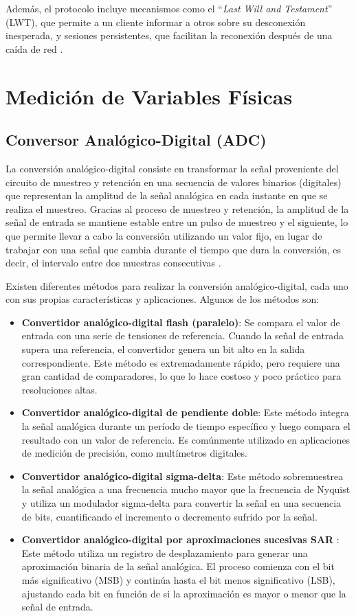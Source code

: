 Además, el protocolo incluye mecanismos como el “\textit{Last Will and Testament}” (LWT), que permite a un cliente informar a otros sobre su desconexión inesperada, y sesiones persistentes, que facilitan la reconexión después de una caída de red \cite{mqtt311, mqtt50}.

\section{Medición de Variables Físicas}
\subsection{Conversor Analógico-Digital (ADC)}
La conversión analógico-digital consiste en transformar la señal proveniente del circuito de muestreo y retención en una secuencia de valores binarios (digitales) que representan la amplitud de la señal analógica en cada instante en que se realiza el muestreo. Gracias al proceso de muestreo y retención, la amplitud de la señal de entrada se mantiene estable entre un pulso de muestreo y el siguiente, lo que permite llevar a cabo la conversión utilizando un valor fijo, en lugar de trabajar con una señal que cambia durante el tiempo que dura la conversión, es decir, el intervalo entre dos muestras consecutivas \cite{floyd2015digital}.

Existen diferentes métodos para realizar la conversión analógico-digital, cada uno con sus propias características y aplicaciones. Algunos de los métodos son:
\begin{itemize}
    \item \textbf{Convertidor analógico-digital flash (paralelo)}: Se compara el valor de entrada con una serie de tensiones de referencia. Cuando la señal de entrada supera una referencia, el convertidor genera un bit alto en la salida correspondiente. Este método es extremadamente rápido, pero requiere una gran cantidad de comparadores, lo que lo hace costoso y poco práctico para resoluciones altas.
    \item \textbf{Convertidor analógico-digital de pendiente doble}: Este método integra la señal analógica durante un período de tiempo específico y luego compara el resultado con un valor de referencia. Es comúnmente utilizado en aplicaciones de medición de precisión, como multímetros digitales.
    \item \textbf{Convertidor analógico-digital sigma-delta}: Este método sobremuestrea la señal analógica a una frecuencia mucho mayor que la frecuencia de Nyquist y utiliza un modulador sigma-delta para convertir la señal en una secuencia de bits, cuantificando el incremento o decremento sufrido por la señal.
    \item \textbf{Convertidor analógico-digital por aproximaciones sucesivas SAR }: Este método utiliza un registro de desplazamiento para generar una aproximación binaria de la señal analógica. El proceso comienza con el bit más significativo (MSB) y continúa hasta el bit menos significativo (LSB), ajustando cada bit en función de si la aproximación es mayor o menor que la señal de entrada.
\end{itemize}

